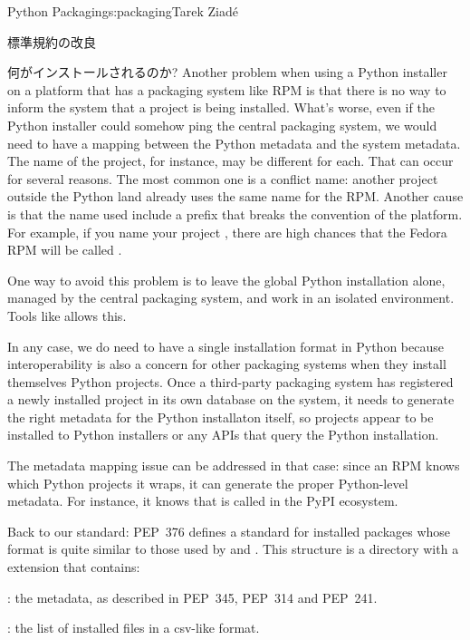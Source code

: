 \begin{aosachapter}{Python Packaging}{s:packaging}{Tarek Ziad\'{e}}
\begin{aosasect1}{標準規約の改良}
\begin{aosasect2}{何がインストールされるのか?}
Another problem when using a Python installer on a platform that has a
packaging system like RPM is that there is no way to inform the system
that a project is being installed. What's worse, even if the Python
installer could somehow ping the central packaging system, we would
need to have a mapping between the Python metadata and the system
metadata. The name of the project, for instance, may be different for
each. That can occur for several reasons. The most common one is 
a conflict name: another project outside the Python land already uses
the same name for the RPM. Another cause is that the name used include
a  prefix that breaks the convention of the platform.
For example, if you name your project , there are high
chances that the Fedora RPM will be called .

One way to avoid this problem is to leave the global Python
installation alone, managed by the central packaging system, and work
in an isolated environment.  Tools like  allows this.

In any case, we do need to have a single installation format in Python
because interoperability is also a concern for other packaging systems
when they install themselves Python projects.  Once a third-party 
packaging system has registered a newly installed project in its 
own database on the system, it needs to generate the right metadata 
for the Python installaton itself, so projects appear to be installed 
to Python installers or any APIs that query the Python installation.

The metadata mapping issue can be addressed in that case: since an RPM
knows which Python projects it wraps, it can generate the proper
Python-level metadata. For instance, it knows that
 is called  in the PyPI ecosystem.

Back to our standard: PEP~376 defines a standard for installed
packages whose format is quite similar to those used by
 and .  This structure is a directory with
a  extension that contains:

\begin{aosaitemize}

  \item {}: the metadata, as described in PEP~345, PEP~314
  and PEP~241.

  \item {}: the list of installed files in a csv-like format.


\end{aosaitemize}
\end{aosasect2}
\end{aosasect1}
\end{aosachapter}
